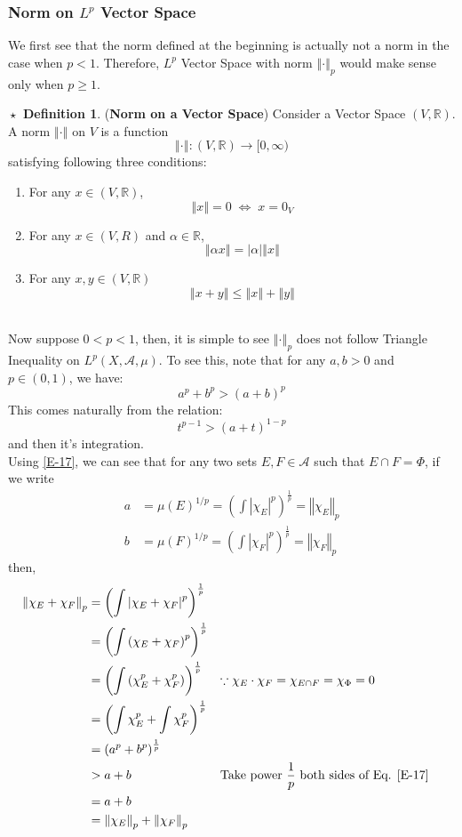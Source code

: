 \documentclass{article}
\theoremstyle{definition}
\newtheorem{definition}{$\boxed{\star}$ Definition}
\theoremstyle{remark}
\theoremstyle{definition}
\theoremstyle{definition}
\theoremstyle{definition}
\newcommand{\abs}[1]{\left \vert #1\right \vert}
\newcommand{\norm}[1]{\left \Vert #1 \right \Vert}
\newcommand{\intrs}{\cap}
\newcommand{\R}{\mathbb{R}}
\newcommand{\alg}[1]{\mathscr{#1}}
\newcommand{\m}[1]{\mu\left (#1\right )}
\newcommand{\Lp}[1]{L^{p}\left (#1\right )}
\newcommand{\wnorm}[2]{\left (\int \abs{#2}^{#1}\right )^{\frac{1}{#1}}}
\begin{document}
\newpage
\subsubsection{Norm on $ L^{p} $ Vector Space}
We first see that the norm defined at the beginning is actually not a norm in the case when $ p< 1 $. Therefore, $ L^{p} $ Vector Space with norm $ \norm{\cdot }_{p} $ would make sense only when $ p \ge 1 $.
\begin{definition}
	(\textbf{Norm on a Vector Space}) Consider a Vector Space $ (V,\R) $. A norm $ \norm{\cdot} $ on $ V $ is a function 
	\[\norm{\cdot } : (V,\R) \to [0,\infty)\]
	satisfying following three conditions:
	\begin{enumerate}
		\item {For any $ x\in (V,\R) $,
	\[\norm{x} = 0\;\iff\;x = 0_{V}\]	
	}
\item {For any $ x\in (V,R) $ and $ \alpha \in \R $,
\[\norm{\alpha x} = \abs{\alpha}\norm{x}\]
}
\item {For any $ x,y \in (V,\R) $
\[\norm{x + y}\le \norm{x} + \norm{y}\]
}
	\end{enumerate}
\end{definition}
\hrulefill
\\
Now suppose $ 0<p<1 $, then, it is simple to see $ \norm{\cdot}_p $ does not follow Triangle Inequality on $ \Lp{X,\alg{A},\mu} $. To see this, note that for any $ a,b > 0 $ and $ p\in (0,1) $, we have:
\begin{equation}\label{E-17}
		a^{p} + b^{p}  > (a+b)^{p}
\end{equation}
This comes naturally from the relation:
\[t^{p-1} > (a+t)^{1-p}\]
and then it's integration.\\
Using \eqref{E-17}, we can see that for any two sets $ E,F \in \alg{A} $ such that $ E\intrs F = \Phi $, if we write 
\begin{align*}
	a&= \m{E}^{1/p} = \wnorm{p}{\chi_{E}} = \norm{\chi_{E}}_{p}\\
	b&= \m{F}^{1/p} = \wnorm{p}{\chi_{F}} = \norm{\chi_{F}}_{p}
\end{align*}
then, 
\begin{align*}
	\norm{\chi_{E} + \chi_{F}}_{p}&= \wnorm{p}{\chi_{E} + \chi_{F}}\\
	&= \left (\int \left (\chi_{E} + \chi_{F}\right )^{p}\right )^{\frac{1}{p}}\\
	&= \left (\int \left (\chi_{E}^{p} + \chi_{F}^{p} \right) \right )^{\frac{1}{p}}&&\text{$ \because \chi_{E} \cdot \chi_{F} = \chi_{E\intrs F} = \chi_{\Phi} = 0$ }\\
	&= \left (\int \chi_{E}^{p} + \int \chi_{F}^{p}\right )^{\frac{1}{p}}\\
	&=\left (a^{p} + b^{p}\right )^{\frac{1}{p}}  \\
	&> a+b &&\text{Take power $ \frac{1}{p}$ both sides of Eq. \eqref{E-17}}\\
	&= a+b\\
	&= \norm{\chi_{E}}_p + \norm{\chi_{F}}_p
\end{align*}
\end{document}
